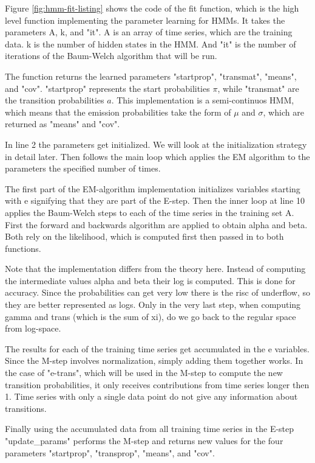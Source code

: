 Figure \ref{fig:hmm-fit-listing} shows the code of the fit function, which is the high level function implementing the parameter learning for HMMs. It takes the parameters A, k, and "it". A is an array of time series, which are the training data. k is the number of hidden states in the HMM. And "it" is the number of iterations of the Baum-Welch algorithm that will be run. 

The function returns the learned parameters "startprop", "transmat", "means", and "cov". "startprop" represents the start probabilities $\pi$, while "transmat" are the transition probabilities $a$. This implementation is a semi-continuos HMM, which means that the emission probabilities take the form of $\mu$ and $\sigma$, which are returned as "means" and "cov". 

In line 2 the parameters get initialized. We will look at the initialization strategy in detail later. Then follows the main loop which applies the EM algorithm to the parameters the specified number of times. 

The first part of the EM-algorithm implementation initializes variables starting with e signifying that they are part of the E-step. Then the inner loop at line 10 applies the Baum-Welch steps to each of the time series in the training set A. First the forward and backwards algorithm are applied to obtain alpha and beta. Both rely on the likelihood, which is computed first then passed in to both functions. 

Note that the implementation differs from the theory here. Instead of computing the intermediate values alpha and beta their log is computed. This is done for accuracy. Since the probabilities can get very low there is the risc of underflow, so they are better represented as logs. Only in the very last step, when computing gamma and trans (which is the sum of xi), do we go back to the regular space from log-space. 

The results for each of the training time series get accumulated in the e variables. Since the M-step involves normalization, simply adding them together works. In the case of "e-trans", which will be used in the M-step to compute the new transition probabilities, it only receives contributions from time series longer then 1. Time series with only a single data point do not give any information about transitions.

Finally using the accumulated data from all training time series in the E-step "update\_params" performs the M-step and returns new values for the four parameters "startprop", "transprop", "means", and "cov". 

